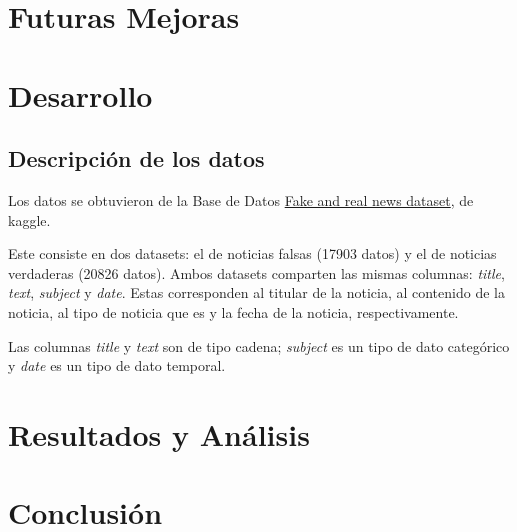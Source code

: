 \section{Futuras Mejoras}
{
\lipsum[1]
}

\section{Desarrollo}
{
\subsection{Descripción de los datos}
{
Los datos se obtuvieron de la Base de Datos \href{https://www.kaggle.com/clmentbisaillon/fake-and-real-news-dataset}{Fake and 
real news dataset}, de kaggle. 

Este consiste en dos datasets: el de noticias falsas (17903 datos) y el de noticias verdaderas (20826 datos). Ambos datasets 
comparten las mismas columnas: \textit{title}, \textit{text}, \textit{subject} y \textit{date}. Estas corresponden al titular de
la noticia, al contenido de la noticia, al tipo de noticia que es y la fecha de la noticia, respectivamente.

Las columnas \textit{title} y \textit{text} son de tipo cadena; \textit{subject} es un tipo de dato categórico y \textit{date}
es un tipo de dato temporal. 
}
}

\section{Resultados y Análisis}
{
\lipsum[3]
}

\section{Conclusión}
{
\lipsum[4]
}